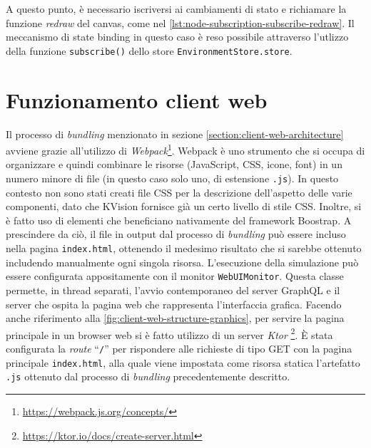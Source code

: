  A questo punto, è necessario iscriversi ai cambiamenti di stato e richiamare la funzione \textit{redraw} del canvas, come nel \cref{lst:node-subscription-subscribe-redraw}. Il meccanismo di state binding in questo caso è reso possibile attraverso l'utlizzo della funzione \texttt{subscribe()} dello store \texttt{EnvironmentStore.store}.

\section{Funzionamento client web}
Il processo di \textit{bundling} menzionato in sezione \ref{section:client-web-architecture} avviene grazie all'utilizzo di \textit{Webpack}\footnote{\url{https://webpack.js.org/concepts/}}. Webpack è uno strumento
che si occupa di organizzare e quindi combinare le risorse (JavaScript, CSS, icone, font) in un numero minore di file (in questo caso solo uno, di estensione \texttt{.js}). In questo contesto non sono stati creati file CSS per la descrizione dell'aspetto delle varie componenti, dato che KVision fornisce già un certo livello di stile CSS. Inoltre, si è fatto uso di elementi che beneficiano nativamente del framework Boostrap. A prescindere da ciò, il file in output dal processo di \textit{bundling} può essere incluso nella pagina \texttt{index.html}, ottenendo il medesimo risultato che si sarebbe ottenuto includendo manualmente ogni singola risorsa.
L'esecuzione della simulazione può essere configurata appositamente con il monitor \texttt{WebUIMonitor}. Questa classe permette, in thread separati, l'avvio contemporaneo del server GraphQL e il server che ospita la pagina web che rappresenta l'interfaccia grafica.
Facendo anche riferimento alla \cref{fig:client-web-structure-graphics}, per servire la pagina principale in un browser web si è fatto utilizzo di un server \textit{Ktor} \footnote{\url{https://ktor.io/docs/create-server.html}}.
È stata configurata la \textit{route} ``\texttt{/}'' per rispondere alle richieste di tipo GET con la pagina principale \texttt{index.html}, alla quale viene impostata come risorsa statica l'artefatto \texttt{.js} ottenuto dal processo di \textit{bundling} precedentemente descritto.
